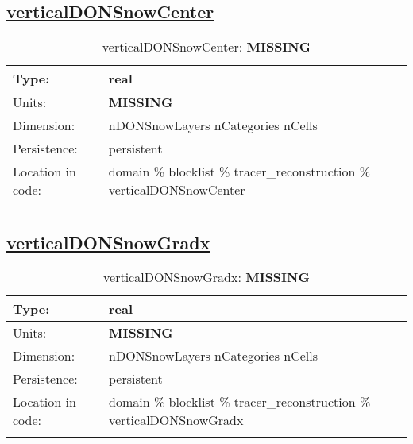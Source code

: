 \subsection[verticalDONSnowCenter]{\hyperref[sec:var_tab_tracer_reconstruction]{verticalDONSnowCenter}}
\label{subsec:var_sec_tracer_reconstruction_verticalDONSnowCenter}
\begin{center}
\begin{longtable}{| p{2.0in} | p{4.0in} |}
        \hline 
        Type: & real \\
        \hline 
        Units: & {\bf \color{red} MISSING} \\
        \hline 
        Dimension: & nDONSnowLayers nCategories nCells \\
        \hline 
        Persistence: & persistent \\
        \hline 
         Location in code: & domain \% blocklist \% tracer\_reconstruction \% verticalDONSnowCenter \\
         \hline 
    \caption{verticalDONSnowCenter: {\bf \color{red} MISSING}}
\end{longtable}
\end{center}
\subsection[verticalDONSnowGradx]{\hyperref[sec:var_tab_tracer_reconstruction]{verticalDONSnowGradx}}
\label{subsec:var_sec_tracer_reconstruction_verticalDONSnowGradx}
\begin{center}
\begin{longtable}{| p{2.0in} | p{4.0in} |}
        \hline 
        Type: & real \\
        \hline 
        Units: & {\bf \color{red} MISSING} \\
        \hline 
        Dimension: & nDONSnowLayers nCategories nCells \\
        \hline 
        Persistence: & persistent \\
        \hline 
         Location in code: & domain \% blocklist \% tracer\_reconstruction \% verticalDONSnowGradx \\
         \hline 
    \caption{verticalDONSnowGradx: {\bf \color{red} MISSING}}
\end{longtable}
\end{center}
